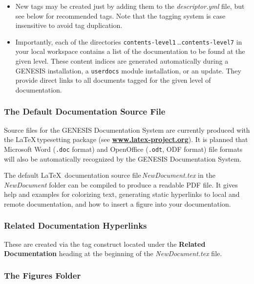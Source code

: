 \documentclass[12pt]{article}
\begin{document}
\begin{itemize}
\begin{itemize}

   \item New tags may be created just by adding them to the {\it descriptor.yml} file, but see below for recommended tags.  Note that the tagging system is case insensitive to avoid tag duplication.

   \item Importantly, each of the directories {\tt contents-level1}\,\ldots {\tt contents-level7} in your local workspace contains a list of the documentation to be found at the given level. These content indices are generated automatically during a GENESIS installation, a {\tt userdocs} module installation, or an update. They provide direct links to all documents tagged for the given level of documentation.
   
\end{itemize}

\end{itemize}

\subsubsection*{The Default Documentation Source File}

Source files for the GENESIS Documentation System are currently produced with the \LaTeX\,typesetting package (see \href{http://www.latex-project.org/}{\bf www.latex-project.org}). It is planned that Microsoft Word ({\tt .doc} format) and OpenOffice ({\tt .odt}, ODF format) file formats will also be automatically recognized by the GENESIS Documentation System.

The default \LaTeX\, documentation source file\,{\it NewDocument.tex} in the {\it NewDocument} folder can be compiled to produce a readable PDF file. It gives help and examples for colorizing text, generating static hyperlinks to local and remote documentation, and how to insert a figure into your documentation.

\subsubsection*{Related Documentation Hyperlinks}

These are created via the tag construct located under the {\bf Related Documentation} heading at the beginning of the {\it NewDocument.tex} file. 

\subsubsection*{The Figures Folder}
\end{document}
